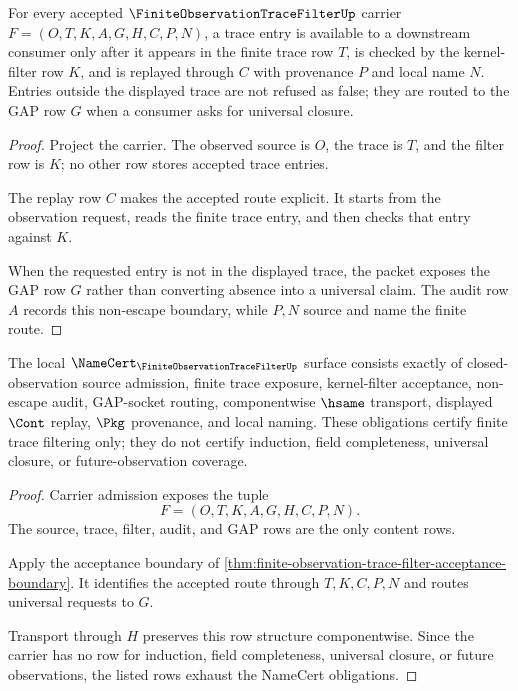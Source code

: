 \begin{theorem}
\label{thm:finite-observation-trace-filter-acceptance-boundary}
For every accepted $\FiniteObservationTraceFilterUp$ carrier
$F=(O,T,K,A,G,H,C,P,N)$, a trace entry is available to a downstream consumer
only after it appears in the finite trace row $T$, is checked by the
kernel-filter row $K$, and is replayed through $C$ with provenance $P$ and
local name $N$. Entries outside the displayed trace are not refused as false;
they are routed to the GAP row $G$ when a consumer asks for universal closure.
\end{theorem}
\begin{proof}
Project the carrier. The observed source is $O$, the trace is $T$, and the
filter row is $K$; no other row stores accepted trace entries.

The replay row $C$ makes the accepted route explicit. It starts from the
observation request, reads the finite trace entry, and then checks that entry
against $K$.

When the requested entry is not in the displayed trace, the packet exposes the
GAP row $G$ rather than converting absence into a universal claim. The audit
row $A$ records this non-escape boundary, while $P,N$ source and name the
finite route.
\end{proof}

\begin{theorem}
\label{thm:finite-observation-trace-filter-namecert-obligations}
The local $\NameCert_{\FiniteObservationTraceFilterUp}$ surface consists
exactly of closed-observation source admission, finite trace exposure,
kernel-filter acceptance, non-escape audit, GAP-socket routing, componentwise
$\hsame$ transport, displayed $\Cont$ replay, $\Pkg$ provenance, and local
naming. These obligations certify finite trace filtering only; they do not
certify induction, field completeness, universal closure, or future-observation
coverage.
\end{theorem}
\begin{proof}
Carrier admission exposes the tuple
$$
F=(O,T,K,A,G,H,C,P,N).
$$
The source, trace, filter, audit, and GAP rows are the only content rows.

Apply the acceptance boundary of
\autoref{thm:finite-observation-trace-filter-acceptance-boundary}. It
identifies the accepted route through $T,K,C,P,N$ and routes universal requests
to $G$.

Transport through $H$ preserves this row structure componentwise. Since the
carrier has no row for induction, field completeness, universal closure, or
future observations, the listed rows exhaust the NameCert obligations.
\end{proof}

